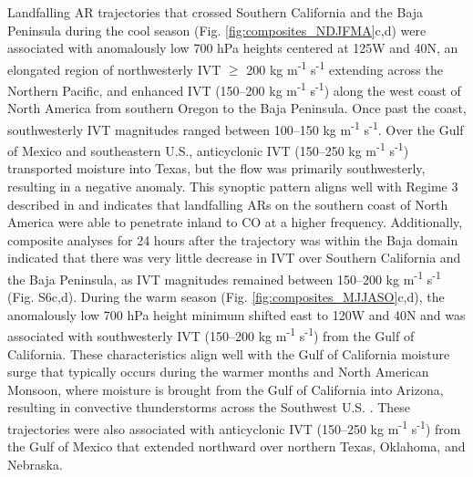\documentclass[draft]{agujournal2019}
\begin{document}
Landfalling AR trajectories that crossed Southern California and the Baja Peninsula during the cool season (Fig. \ref{fig:composites_NDJFMA}c,d) were associated with anomalously low 700 hPa heights centered at 125\textdegree W and 40\textdegree N, an elongated region of northwesterly IVT $\geq$ 200 kg m\textsuperscript{-1} s\textsuperscript{-1} extending across the Northern Pacific, and enhanced IVT (150--200 kg m\textsuperscript{-1} s\textsuperscript{-1}) along the west coast of North America from southern Oregon to the Baja Peninsula. Once past the coast, southwesterly IVT magnitudes ranged between 100--150 kg m\textsuperscript{-1} s\textsuperscript{-1}. Over the Gulf of Mexico and southeastern U.S., anticyclonic IVT (150--250 kg m\textsuperscript{-1} s\textsuperscript{-1}) transported moisture into Texas, but the flow was primarily southwesterly, resulting in a negative anomaly. This synoptic pattern aligns well with Regime 3 described in  and indicates that landfalling ARs on the southern coast of North America were able to penetrate inland to CO at a higher frequency. Additionally, composite analyses for 24 hours after the trajectory was within the Baja domain indicated that there was very little decrease in IVT over Southern California and the Baja Peninsula, as IVT magnitudes remained between 150--200 kg m\textsuperscript{-1} s\textsuperscript{-1} (Fig. S6c,d). During the warm season (Fig. \ref{fig:composites_MJJASO}c,d), the anomalously low 700 hPa height minimum shifted east to 120\textdegree W and 40\textdegree N and was associated with southwesterly IVT (150--200 kg m\textsuperscript{-1} s\textsuperscript{-1}) from the Gulf of California. These characteristics align well with the Gulf of California moisture surge that typically occurs during the warmer months and North American Monsoon, where moisture is brought from the Gulf of California into Arizona, resulting in convective thunderstorms across the Southwest U.S. \cite{Higgins2004RelationshipsStates}. These trajectories were also associated with anticyclonic IVT (150--250 kg m\textsuperscript{-1} s\textsuperscript{-1}) from the Gulf of Mexico that extended northward over northern Texas, Oklahoma, and Nebraska. 


\end{document}
